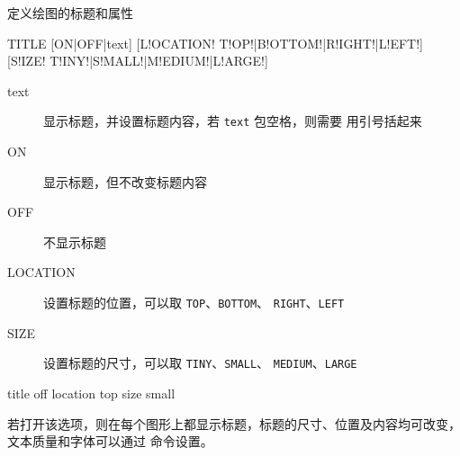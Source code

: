 \label{cmd:title}

定义绘图的标题和属性

\begin{SACSTX}
TITLE [ON|OFF|text] [L!OCATION! T!OP!|B!OTTOM!|R!IGHT!|L!EFT!]
    [S!IZE! T!INY!|S!MALL!|M!EDIUM!|L!ARGE!]
\end{SACSTX}

\begin{description}
\item [text] 显示标题，并设置标题内容，若 \texttt{text} 包空格，则需要
    用引号括起来
\item [ON] 显示标题，但不改变标题内容
\item [OFF] 不显示标题
\item [LOCATION] 设置标题的位置，可以取 \texttt{TOP}、\texttt{BOTTOM}、
    \texttt{RIGHT}、\texttt{LEFT}
\item [SIZE] 设置标题的尺寸，可以取 \texttt{TINY}、\texttt{SMALL}、
    \texttt{MEDIUM}、\texttt{LARGE}
\end{description}

\begin{SACDFT}
title off location top size small
\end{SACDFT}

若打开该选项，则在每个图形上都显示标题，标题的尺寸、位置及内容均可改变，
文本质量和字体可以通过  命令设置。
